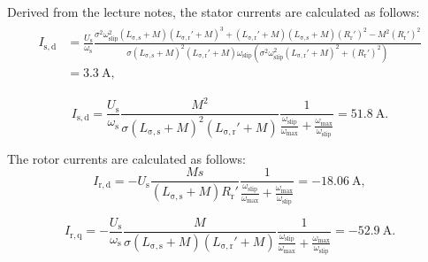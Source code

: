 \begin{solutionblock}
    Derived from the lecture notes, the stator currents are calculated as follows:
    \begin{align}
        \begin{split}
        I_{\mathrm{s,d}} &= \frac{U_{\mathrm{s}}}{\omega_{\mathrm{s}}} \frac{\sigma^2\omega_{\mathrm{slip}}^2 \left(L_{\mathrm{\sigma,s}}+M\right)\left(L_{\mathrm{\sigma,r}}'+M\right)^3 + \left(L_{\mathrm{\sigma,r}}'+M\right)\left(L_{\mathrm{\sigma,s}}+M\right)\left(R_{\mathrm{r}}'\right)^2 - M^2 \left(R_{\mathrm{r}}'\right)^2}{\sigma \left(L_{\mathrm{\sigma,s}}+M\right)^2 \left(L_{\mathrm{\sigma,r}}'+M\right)\omega_{\mathrm{slip}}\left(\sigma^2 \omega_{\mathrm{slip}}^2 \left(L_{\mathrm{\sigma,r}}'+M\right)^2 + \left(R_{\mathrm{r}}'\right)^2\right)}\\
        &= \SI{3.3}{\ampere},
        \end{split}
    \end{align}
    
    \begin{equation}
        I_{\mathrm{s,d}} = \frac{U_{\mathrm{s}}}{\omega_{\mathrm{s}}} \frac{M^2}{\sigma\left(L_{\mathrm{\sigma,s}}+M\right)^2 \left(L_{\mathrm{\sigma,r}}'+M\right)} \frac{1}{\frac{\omega_{\mathrm{slip}}}{\omega_{\mathrm{max}}} + \frac{\omega_{\mathrm{max}}}{\omega_{\mathrm{slip}}}}
        = \SI{51.8}{\ampere}.
    \end{equation}
    
    
    The rotor currents are calculated as follows:
    \begin{equation}
        I_{\mathrm{r,d}} = -U_{\mathrm{s}} \frac{M s}{\left(L_{\mathrm{\sigma,s}}+M\right) R_{\mathrm{r}}'}\frac{1}{\frac{\omega_{\mathrm{slip}}}{\omega_{\mathrm{max}}} + \frac{\omega_{\mathrm{max}}}{\omega_{\mathrm{slip}}}}
        = \SI{-18.06}{\ampere},
    \end{equation}

    \begin{equation}
        I_{\mathrm{r,q}} = -\frac{U_{\mathrm{s}}}{\omega_{\mathrm{s}}}\frac{M}{\sigma \left(L_{\mathrm{\sigma,s}}+M\right)\left(L_{\mathrm{\sigma,r}}'+M\right)}\frac{1}{\frac{\omega_{\mathrm{slip}}}{\omega_{\mathrm{max}}} + \frac{\omega_{\mathrm{max}}}{\omega_{\mathrm{slip}}}}
        = \SI{-52.9}{\ampere}.
    \end{equation}

    

\end{solutionblock}


